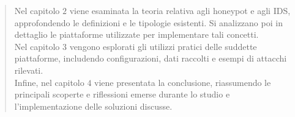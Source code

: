 \begin{quote}
	{\small Nel capitolo $2$ viene esaminata la teoria relativa agli honeypot e agli IDS, approfondendo le definizioni e le tipologie esistenti. Si analizzano poi in dettaglio le piattaforme utilizzate per implementare tali concetti.\\
	Nel capitolo $3$ vengono esplorati gli utilizzi pratici delle suddette piattaforme, includendo configurazioni, dati raccolti e esempi di attacchi rilevati.\\
	Infine, nel capitolo $4$ viene presentata la conclusione, riassumendo le principali scoperte e riflessioni emerse durante lo studio e l'implementazione delle soluzioni discusse.}
\end{quote}